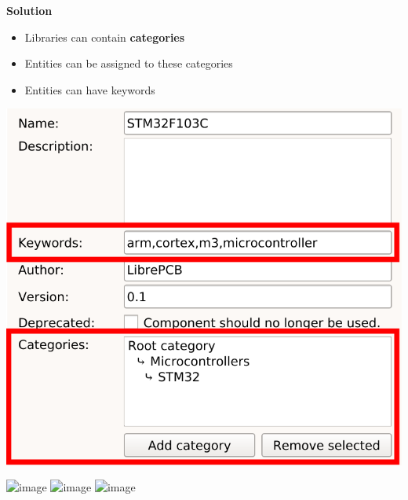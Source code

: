 \begin{frame}{\secname}
  \textbf{Solution}
  \begin{itemize}
    \item Libraries can contain \textbf{categories}
    \item Entities can be assigned to these categories
    \item Entities can have keywords
  \end{itemize}
  \begin{center}
    \includegraphics[width=.45\textwidth]{images/library_keywords_and_categories.png}
  \end{center}
\end{frame}

\begin{frame}[noframenumbering]{\secname}
  \begin{center}
    \includegraphics<1>[width=.95\textwidth]{images/library_browser_categories_stm32.png}
    \includegraphics<2>[width=.95\textwidth]{images/library_browser_categories_diode.png}
    \includegraphics<3>[width=.95\textwidth]{images/library_browser_keywords.png}
  \end{center}
\end{frame}
